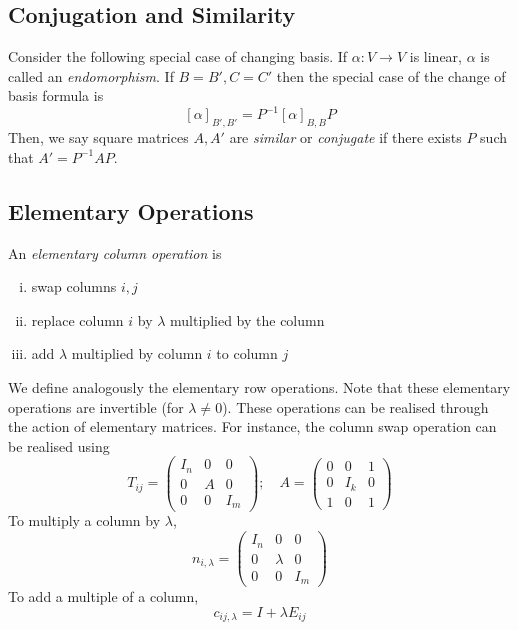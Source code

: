 \subsection{Conjugation and Similarity}
Consider the following special case of changing basis.
If \( \alpha \colon V \to V \) is linear, \( \alpha \) is called an \textit{endomorphism}.
If \( B = B', C = C' \) then the special case of the change of basis formula is
\[ [\alpha]_{B',B'} = P^{-1} [\alpha]_{B,B} P \]
Then, we say square matrices \( A, A' \) are \textit{similar} or \textit{conjugate} if there exists \( P \) such that \( A' = P^{-1} A P \).

\subsection{Elementary Operations}
\begin{definition}
    An \textit{elementary column operation} is
    \begin{enumerate}[(i)]
        \item swap columns \( i, j \)
        \item replace column \( i \) by \( \lambda \) multiplied by the column
        \item add \( \lambda \) multiplied by column \( i \) to column \( j \)
    \end{enumerate}
\end{definition}
We define analogously the elementary row operations.
Note that these elementary operations are invertible (for \( \lambda \neq 0 \)).
These operations can be realised through the action of elementary matrices.
For instance, the column swap operation can be realised using
\[ T_{ij} = \begin{pmatrix}
    I_n & 0 & 0 \\
    0 & A & 0 \\
    0 & 0 & I_m
\end{pmatrix};\quad A = \begin{pmatrix}
    0 & 0 & 1 \\
    0 & I_k & 0 \\
    1 & 0 & 1
\end{pmatrix} \]
To multiply a column by \( \lambda \),
\[ n_{i,\lambda} = \begin{pmatrix}
    I_n & 0 & 0 \\
    0 & \lambda & 0 \\
    0 & 0 & I_m
\end{pmatrix} \]
To add a multiple of a column,
\[ c_{ij,\lambda} = I + \lambda E_{ij} \]
